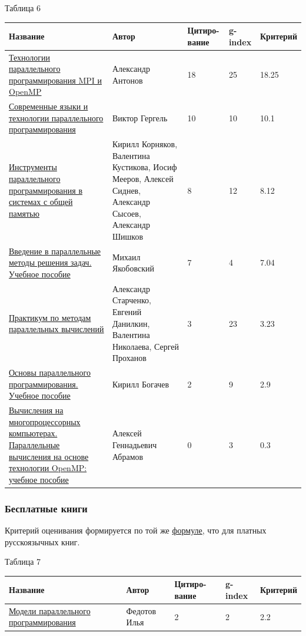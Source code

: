 \documentclass{article}
\begin{document}
			\begin{flushleft}
				Таблица 6
				\begin{longtable}{|p{6cm}|p{4cm}|p{1.8cm}|p{1.55cm}|p{2cm}|}
\hline
Название & Автор & Цитиро-вание & g-index & Критерий \\\hline

\href{https://www.ozon.ru/context/detail/id/19898952}{Технологии параллельного программирования MPI и OpenMP} &
Александр Антонов & 18 & 25 & 18.25\\\hline 

\href{https://www.ozon.ru/context/detail/id/19453470}{Современные языки и технологии параллельного программирования} &
Виктор Гергель & 10 & 10 & 10.1\\\hline

\href{https://www.ozon.ru/context/detail/id/7374160}{Инструменты параллельного программирования в системах с общей памятью} &
Кирилл Корняков, Валентина Кустикова, Иосиф Мееров, Алексей Сиднев, Александр Сысоев, Александр Шишков & 8 & 12 & 8.12\\\hline

\href{https://www.ozon.ru/context/detail/id/23944160}{Введение в параллельные методы решения задач. Учебное пособие} &
Михаил Якобовский & 7 & 4 & 7.04\\\hline

\href{https://www.ozon.ru/context/detail/id/7374161}{Практикум по методам параллельных вычислений} &
Александр Старченко, Евгений Данилкин, Валентина Николаева, Сергей Проханов & 3 & 23 & 3.23\\\hline

\href{https://www.ozon.ru/context/detail/id/28338796}{Основы параллельного программирования. Учебное пособие} &
Кирилл Богачев & 2 & 9 & 2.9 \\\hline

\href{https://books.google.ru/books?id=9n7UkQEACAAJ&hl=ru&sa=X&ved=0ahUKEwi_zKeMs6HLAhXLiCwKHSjuBjQQ6AEIHDAA}{Вычисления на многопроцессорных компьютерах. Параллельные вычисления на основе технологии OpenMP: учебное пособие} &
Алексей Геннадьевич Абрамов & 0 & 3 & 0.3 \\\hline
				\end{longtable}
\newpage	
			\end{flushleft}
\newpage
		\subsubsection{Бесплатные книги}
		Критерий оценивания формируется по той же \hyperlink{formula2}{формуле}, что для платных русскоязычных книг.			
			\begin{flushleft}
				Таблица 7
				\begin{longtable}{|p{6cm}|p{4cm}|p{1.8cm}|p{1.55cm}|p{2cm}|}
\hline
Название & Автор & Цитиро-вание & g-index & Критерий \\\hline

\href{http://pp-book.narod.ru/ppm-book.html}{Модели параллельного программирования} &
Федотов Илья & 2 & 2 & 2.2 \\\hline


				\end{longtable}
			\end{flushleft}
\newpage
\end{document}

